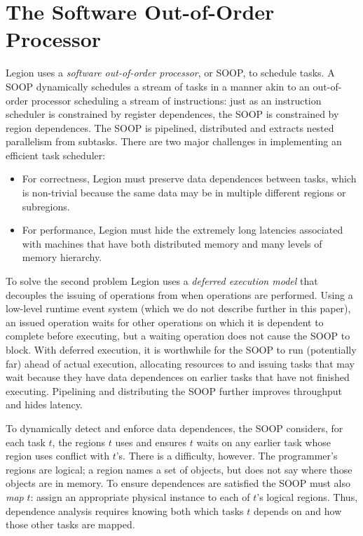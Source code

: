 \section{The Software Out-of-Order Processor}
\label{sec:soop}

Legion uses a {\em  software out-of-order processor}, or SOOP, to schedule tasks.  A SOOP 
dynamically schedules a stream of tasks in a manner akin to an out-of-order processor scheduling a stream of instructions:
just as an instruction scheduler is constrained by register dependences,
the SOOP is constrained by region dependences.
The SOOP  is pipelined, distributed and extracts nested parallelism from subtasks.
There are two major challenges in implementing an efficient task scheduler:
\begin{itemize}
\item  For correctness, Legion must preserve data dependences between tasks, which is non-trivial
because the same data may be in multiple different regions or subregions.
  
\item For performance, Legion must hide the extremely long latencies associated
  with machines that have both distributed memory and many levels of
  memory hierarchy.
\end{itemize}

To solve the second problem Legion uses a {\em deferred execution model} that decouples the issuing
of operations from when operations are performed.  Using a low-level runtime event system (which we do
not describe further in this paper), an issued operation waits for other operations on
which it is dependent to complete before executing, but a waiting operation does not cause the SOOP
to block.  With deferred execution, it is worthwhile for the SOOP to run (potentially far) ahead of actual execution,
allocating resources to and issuing tasks that may wait because they have data dependences on earlier tasks that have not 
finished executing.   Pipelining and distributing the SOOP further improves throughput and hides latency.

To dynamically detect and enforce data dependences,
the SOOP considers, for each task $t$, the
regions $t$ uses and ensures $t$ waits on any
earlier task whose region uses conflict with $t$'s.  There is a
difficulty, however.  The programmer's regions are logical; a region
names a set of objects, but does not say where those objects
are in memory.  To ensure dependences are satisfied the SOOP must also {\em map} $t$: assign an
appropriate physical instance to each of $t$'s logical regions.  Thus, dependence
analysis requires knowing both which tasks $t$ depends on and how those
other tasks are mapped.

